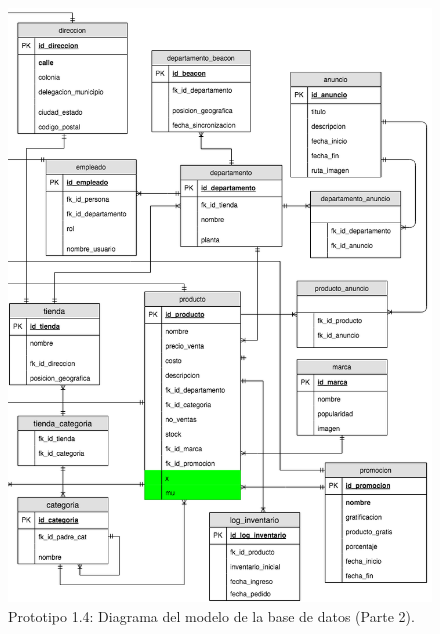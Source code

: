 \FloatBarrier
\begin{figure}[htbp!]
		\centering
			\includegraphics[width=.9 \textwidth]{imagenes/modeloDatos/prototipo14/TT_Database_3}
		\caption{Prototipo 1.4: Diagrama del modelo de la base de datos (Parte 2).}
		\label{image:prototipo14basededatos3}
\end{figure}
\FloatBarrier








